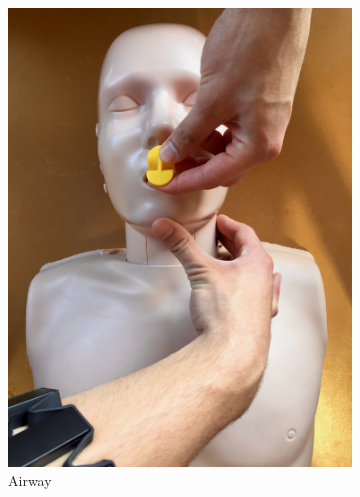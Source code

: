 \begin{figure}
\begin{subfigure}[b]{0.18\textwidth}
 		\includegraphics[width=\textwidth]{pictures/oral-airway}
 		\caption{Airway}
 		\label{fig:oral-airway}
 	\end{subfigure}
 	~ %
	 \begin{subfigure}[b]{0.18\textwidth}

\end{subfigure}
\end{figure}
